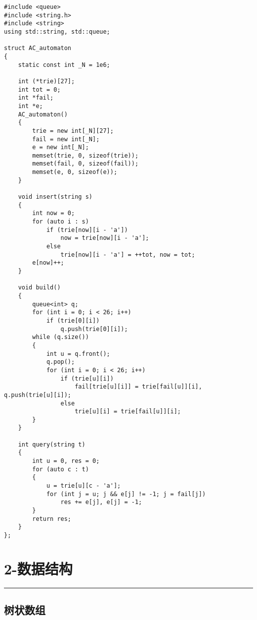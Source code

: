 \documentclass[]{article}
\begin{document}
\begin{verbatim}
#include <queue>
#include <string.h>
#include <string>
using std::string, std::queue;

struct AC_automaton
{
    static const int _N = 1e6;

    int (*trie)[27];
    int tot = 0;
    int *fail;
    int *e;
    AC_automaton()
    {
        trie = new int[_N][27];
        fail = new int[_N];
        e = new int[_N];
        memset(trie, 0, sizeof(trie));
        memset(fail, 0, sizeof(fail));
        memset(e, 0, sizeof(e));
    }

    void insert(string s)
    {
        int now = 0;
        for (auto i : s)
            if (trie[now][i - 'a'])
                now = trie[now][i - 'a'];
            else
                trie[now][i - 'a'] = ++tot, now = tot;
        e[now]++;
    }

    void build()
    {
        queue<int> q;
        for (int i = 0; i < 26; i++)
            if (trie[0][i])
                q.push(trie[0][i]);
        while (q.size())
        {
            int u = q.front();
            q.pop();
            for (int i = 0; i < 26; i++)
                if (trie[u][i])
                    fail[trie[u][i]] = trie[fail[u]][i], q.push(trie[u][i]);
                else
                    trie[u][i] = trie[fail[u]][i];
        }
    }

    int query(string t)
    {
        int u = 0, res = 0;
        for (auto c : t)
        {
            u = trie[u][c - 'a'];
            for (int j = u; j && e[j] != -1; j = fail[j])
                res += e[j], e[j] = -1;
        }
        return res;
    }
};

\end{verbatim}

\hypertarget{ux6570ux636eux7ed3ux6784}{%
\section{2-数据结构}\label{ux6570ux636eux7ed3ux6784}}

\begin{center}\rule{0.5\linewidth}{0.5pt}\end{center}

\hypertarget{ux6811ux72b6ux6570ux7ec4}{%
\subsection{树状数组}\label{ux6811ux72b6ux6570ux7ec4}}
\end{document}
